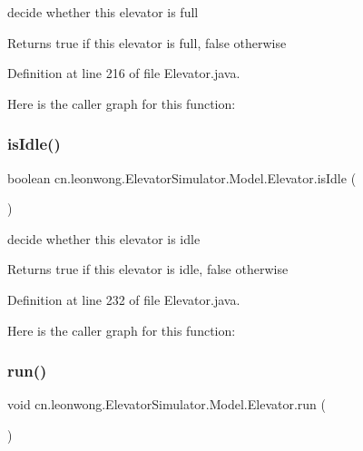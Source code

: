 decide whether this elevator is full \begin{DoxyReturn}{Returns}
true if this elevator is full, false otherwise 
\end{DoxyReturn}


Definition at line 216 of file Elevator.\+java.

Here is the caller graph for this function\+:
\mbox{\label{classcn_1_1leonwong_1_1_elevator_simulator_1_1_model_1_1_elevator_afef928208c5445a18af5d567ce9a4467}} 
\subsubsection{\texorpdfstring{is\+Idle()}{isIdle()}}
{\footnotesize\ttfamily boolean cn.\+leonwong.\+Elevator\+Simulator.\+Model.\+Elevator.\+is\+Idle (\begin{DoxyParamCaption}{ }\end{DoxyParamCaption})}

decide whether this elevator is idle \begin{DoxyReturn}{Returns}
true if this elevator is idle, false otherwise 
\end{DoxyReturn}


Definition at line 232 of file Elevator.\+java.

Here is the caller graph for this function\+:
\mbox{\label{classcn_1_1leonwong_1_1_elevator_simulator_1_1_model_1_1_elevator_af9cb9d7e34873bc531ec71aa4ed3deae}} 
\subsubsection{\texorpdfstring{run()}{run()}}
{\footnotesize\ttfamily void cn.\+leonwong.\+Elevator\+Simulator.\+Model.\+Elevator.\+run (\begin{DoxyParamCaption}{ }\end{DoxyParamCaption})}

